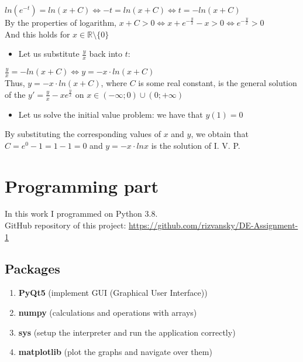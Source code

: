 \documentclass[12pt, a4paper]{article}
\begin{document}
    \begin{center}
        $ln(e^{-t}) = ln(x + C) \Leftrightarrow -t = ln(x + C) \Leftrightarrow t = -ln(x + C)$\\
        By the properties of logarithm, $x + C > 0 \Leftrightarrow x + e^{-\frac{y}{x}} - x > 0 \Leftrightarrow e^{-\frac{y}{x}} > 0$ \\
        And this holds for $x \in \mathbb{R} \setminus \{0\}$
    \end{center}
    
    \begin{itemize}
        \item Let us substitute $\frac{y}{x}$ back into $t$:
    \end{itemize}
    
    \begin{center}
        $\frac{y}{x} = -ln(x + C) \Leftrightarrow y = -x \cdot ln(x + C)$ \\
        Thus, $y = -x \cdot ln(x + C)$, where $C$ is some real constant, is the general solution of the $y' = \frac{y}{x} - xe^{\frac{y}{x}}$ on $x \in (-\infty; 0) \cup (0; +\infty)$ \\
    \end{center}
    
    \begin{itemize}
        \item Let us solve the initial value problem: we have that $y(1) = 0$ 
    \end{itemize}
    
    \begin{center}
        By substituting the corresponding values of $x$ and $y$, we obtain that $C = e^{0} - 1 = 1 - 1 = 0$ and $y = -x \cdot lnx$ is the solution of I. V. P. \\
    \end{center}
\newpage
\section{Programming part}

    In this work I programmed on Python 3.8.\\ GitHub repository of this project: \url{https://github.com/rizvansky/DE-Assignment-1} 
    \subsection{Packages}
        \begin{enumerate}
            \item \textbf{PyQt5} (implement GUI (Graphical User Interface))
            \item \textbf{numpy} (calculations and operations with arrays)
            \item \textbf{sys} (setup the interpreter and run the application correctly)
            \item \textbf{matplotlib} (plot the graphs and navigate over them)
        \end{enumerate}
        
\end{document}
